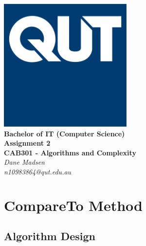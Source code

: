 \documentclass[12pt,a4paper]{article}
\begin{document}
	\begin{titlepage}
		
		\begin{center}
			\includegraphics[width=0.5\textwidth]{QUT.jpg}\\
			[0.03\textheight]  
			\Large\textbf{Bachelor of IT (Computer Science)}\\
			\Large\textbf{Assignment 2}\\
			\large\textbf{CAB301 - Algorithms and Complexity}\\
			[0.02\textheight]
			\large\textsl{Dane Madsen}\\
			\large\textsl{n10983864@qut.edu.au}
		\end{center}
		
	\end{titlepage}
	\tableofcontents
	\newpage
	
	\section{CompareTo Method}
		\subsection{Algorithm Design}
			
\end{document}
